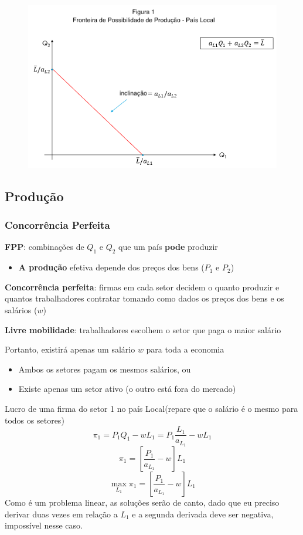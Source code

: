 \documentclass[a4paper,12pt]{article}[abntex2]
\begin{document}
\begin{figure}[H]
    \centering
    \includegraphics[width=0.7\linewidth]{Imagens/a7i1.png}
\end{figure}

\subsection{\textbf{Produção}}
\subsubsection{\textbf{Concorrência Perfeita}}
\textbf{FPP}: combinações de \( Q_1 \) e \( Q_2 \) que um país \textbf{pode} produzir
\begin{itemize}
    \item \textbf{A produção} efetiva depende dos preços dos bens (\( P_1 \) e \( P_2 \))
\end{itemize}

\textbf{Concorrência perfeita}: firmas em cada setor decidem o quanto produzir e quantos trabalhadores contratar tomando como dados os preços dos bens e os salários (\( w \))

\textbf{Livre mobilidade}: trabalhadores escolhem o setor que paga o maior salário

Portanto, existirá apenas um salário \( w \) para toda a economia
\begin{itemize}
    \item Ambos os setores pagam os mesmos salários, ou
    \item Existe apenas um setor ativo (o outro está fora do mercado)
\end{itemize}

Lucro de uma firma do setor 1 no país Local(repare que o salário é o mesmo para todos os setores)
\[
\pi_1=P_1Q_1-wL_1=P_1\frac{L_1}{a_{L_1}}-wL_1
\]
\[
\pi_1=\left[\frac{P_1}{a_{L_1}}-w\right]L_1
\]
\[
\max_{L_1}\pi_1=\left[\frac{P_1}{a_{L_1}}-w\right]L_1 
\]
Como é um problema linear, as soluções serão de canto, dado que eu preciso derivar duas vezes em relação a \(L_1\) e a segunda derivada deve ser negativa, impossível nesse caso.
\end{document}
